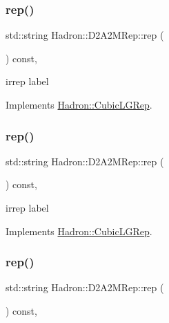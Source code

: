 \subsubsection{\texorpdfstring{rep()}{rep()}\hspace{0.1cm}{\footnotesize\ttfamily [1/3]}}
{\footnotesize\ttfamily std\+::string Hadron\+::\+D2\+A2\+M\+Rep\+::rep (\begin{DoxyParamCaption}{ }\end{DoxyParamCaption}) const\hspace{0.3cm}{\ttfamily [inline]}, {\ttfamily [virtual]}}

irrep label 

Implements \mbox{\hyperlink{structHadron_1_1CubicLGRep_a50f5ddbb8f4be4cee0106fa9e8c75e6c}{Hadron\+::\+Cubic\+L\+G\+Rep}}.

\mbox{\label{structHadron_1_1D2A2MRep_af770f75006ed187caad6a1bf3df3e64e}} 
\subsubsection{\texorpdfstring{rep()}{rep()}\hspace{0.1cm}{\footnotesize\ttfamily [2/3]}}
{\footnotesize\ttfamily std\+::string Hadron\+::\+D2\+A2\+M\+Rep\+::rep (\begin{DoxyParamCaption}{ }\end{DoxyParamCaption}) const\hspace{0.3cm}{\ttfamily [inline]}, {\ttfamily [virtual]}}

irrep label 

Implements \mbox{\hyperlink{structHadron_1_1CubicLGRep_a50f5ddbb8f4be4cee0106fa9e8c75e6c}{Hadron\+::\+Cubic\+L\+G\+Rep}}.

\mbox{\label{structHadron_1_1D2A2MRep_af770f75006ed187caad6a1bf3df3e64e}} 
\subsubsection{\texorpdfstring{rep()}{rep()}\hspace{0.1cm}{\footnotesize\ttfamily [3/3]}}
{\footnotesize\ttfamily std\+::string Hadron\+::\+D2\+A2\+M\+Rep\+::rep (\begin{DoxyParamCaption}{ }\end{DoxyParamCaption}) const\hspace{0.3cm}{\ttfamily [inline]}, {\ttfamily [virtual]}}

